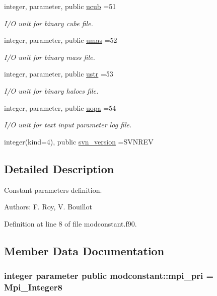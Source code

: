 \begin{DoxyCompactItemize}
integer, parameter, public \hyperlink{classmodconstant_a9509aa964770163a2cc1dab767b7afc1}{ucub} =51
\begin{DoxyCompactList}\small\item\em I/\-O unit for binary cube file. \end{DoxyCompactList}\item 
integer, parameter, public \hyperlink{classmodconstant_a7c4638477348db5b2b973ec77d289248}{umas} =52
\begin{DoxyCompactList}\small\item\em I/\-O unit for binary mass file. \end{DoxyCompactList}\item 
integer, parameter, public \hyperlink{classmodconstant_af348170b4f06a596d512347383aa406b}{ustr} =53
\begin{DoxyCompactList}\small\item\em I/\-O unit for binary haloes file. \end{DoxyCompactList}\item 
integer, parameter, public \hyperlink{classmodconstant_aa03af4caf7d57d16746ad4cb3c673677}{uopa} =54
\begin{DoxyCompactList}\small\item\em I/\-O unit for text input parameter log file. \end{DoxyCompactList}\item 
integer(kind=4), public \hyperlink{classmodconstant_aa77df404168800abb297de67a837cb04}{svn\-\_\-version} =S\-V\-N\-R\-E\-V
\end{DoxyCompactItemize}


\subsection{Detailed Description}
Constant parameters definition. 

Authors\-: F. Roy, V. Bouillot 

Definition at line 8 of file modconstant.\-f90.



\subsection{Member Data Documentation}
\hypertarget{classmodconstant_a4717a1a875853ed2396e076e95fa12f1}{
\subsubsection[{mpi\-\_\-pri}]{\setlength{\rightskip}{0pt plus 5cm}integer parameter public modconstant\-::mpi\-\_\-pri = Mpi\-\_\-\-Integer8}}\label{classmodconstant_a4717a1a875853ed2396e076e95fa12f1}


